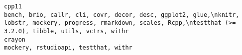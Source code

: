\documentclass[
  letterpaper,
  DIV=11,
  numbers=noendperiod]{scrreprt}
\begin{document}
\begin{verbatim}
cpp11                                                                                                                                                                                                                                                                                                                                                                                                                                                                                                                                                                                                                                                                                                                                                                                                                                                                                                                                                                                                                                                                                                                                bench, brio, callr, cli, covr, decor, desc, ggplot2, glue,\nknitr, lobstr, mockery, progress, rmarkdown, scales, Rcpp,\ntestthat (>= 3.2.0), tibble, utils, vctrs, withr
crayon                                                                                                                                                                                                                                                                                                                                                                                                                                                                                                                                                                                                                                                                                                                                                                                                                                                                                                                                                                                                                                                                                                                                                                                                                                                                   mockery, rstudioapi, testthat, withr

\end{verbatim}
\end{document}
